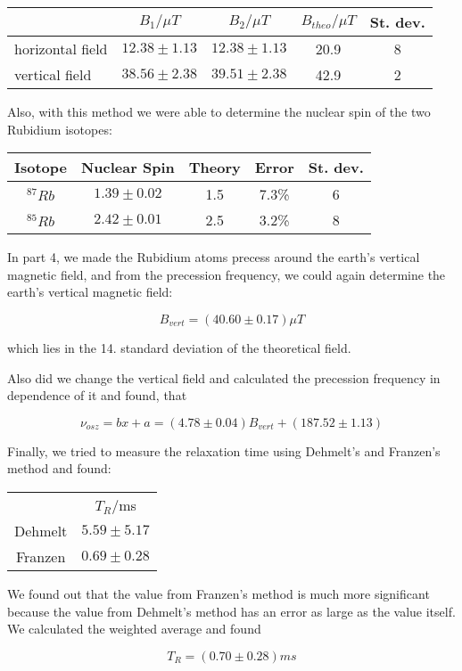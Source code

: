 \begin{center}
\begin{tabular}[H]{| l | c c c c |} \hline
 & $B_1 /\mu T$ & $B_2 /\mu T$ & $B_{theo} /\mu T$ & St. dev.\\ \hline
horizontal field & $12.38 \pm 1.13$ & $12.38 \pm 1.13$ &  20.9 & 8 \\
vertical field & $38.56 \pm 2.38$ & $39.51 \pm 2.38$ & 42.9 & 2 \\ \hline
\end{tabular}
\end{center}

Also, with this method we were able to determine the nuclear spin of the two Rubidium isotopes:

\begin{center}
\begin{tabular}[H]{| c | c c c c |} \hline
Isotope & Nuclear Spin & Theory & Error & St. dev. \\ \hline
 $^{87}Rb$ & $1.39 \pm 0.02$ & 1.5 & 7.3\% & 6 \\
 $^{85}Rb$ & $2.42 \pm 0.01$ & 2.5 & 3.2\% & 8\\  \hline
\end{tabular}
\end{center}

In part 4, we made the Rubidium atoms precess around the earth's vertical magnetic field, and from the precession frequency, we could again determine the earth's vertical magnetic field:

$$B_{vert} = (40.60\pm0.17) \mu T $$

which lies in the 14. standard deviation of the theoretical field.

Also did we change the vertical field and calculated the precession frequency in dependence of it and found, that 

$$\nu_{osz} = bx + a = (4.78\pm0.04)B_{vert} + (187.52\pm1.13)$$

Finally, we tried to measure the relaxation time using Dehmelt's and Franzen's method and found:

\begin{center}
\begin{tabular}[H]{c c}
		& $T_R$/ms \\
Dehmelt 	& $5.59 \pm 5.17$ \\
Franzen 	& $0.69 \pm 0.28$ \\
\end{tabular}
\end{center}

We found out that the value from Franzen's method is much more significant because the value from Dehmelt's method has an error as large as the value itself. We calculated the weighted average and found

$$T_R = (0.70 \pm 0.28) ms$$







